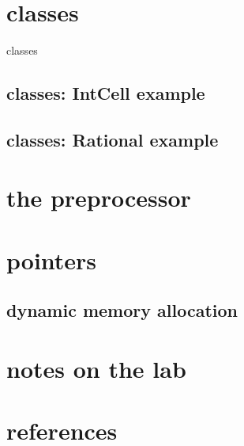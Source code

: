 

\section{classes}

\begin{frame}{classes}
\end{frame}

\subsection{classes: IntCell example}



\subsection{classes: Rational example}




\section{the preprocessor}



\section{pointers}



\subsection{dynamic memory allocation}



\section{notes on the lab}




\section{references}

